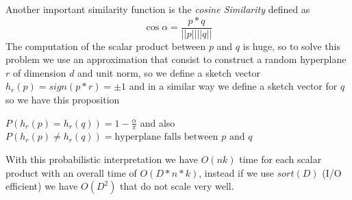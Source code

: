     Another important similarity function is the \emph{cosine Similarity} defined as 
    \[ \cos \alpha = \frac{p * q}{||p|| ||q||} \]
    The computation of the scalar product between $p$ and $q$ is huge, so to solve this problem we use an approximation that consist to construct a random hyperplane $r$ of dimension $d$ and unit norm,
    so we define a sketch vector $h_r(p) = sign(p * r) = \pm 1$ and in a similar way we define a sketch vector for $q$ so we have this proposition
    \begin{prop}
	    $P(h_r(p) = h_r(q)) = 1 - \frac{\alpha}{\pi}$ and also $P(h_r(p) \neq h_r(q)) = \text{hyperplane falls between } p \text{ and } q$
    \end{prop}
    With this probabilistic interpretation we have $O(nk)$ time for each scalar product with an overall time of $O(D * n * k)$, instead if we use $sort(D)$ (I/O efficient) 
    we have $O(D^2)$ that do not scale very well.



